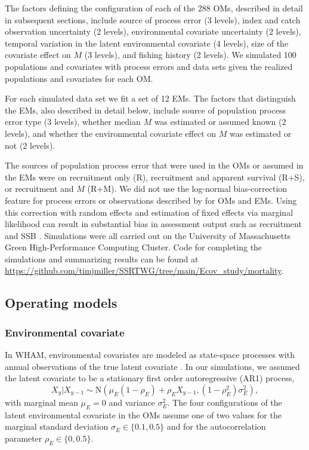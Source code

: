 \documentclass[
  12pt,
]{article}
\begin{document}
The factors defining the configuration of each of the 288 OMs, described
in detail in subsequent sections, include source of process error (3
levels), index and catch observation uncertainty (2 levels),
environmental covariate uncertainty (2 levels), temporal variation in
the latent environmental covariate (4 levels), size of the covariate
effect on \(M\) (3 levels), and fishing history (2 levels). We simulated
100 populations and covariates with process errors and data sets given
the realized populations and covariates for each OM.

For each simulated data set we fit a set of 12 EMs. The factors that
distinguish the EMs, also described in detail below, include source of
population process error type (3 levels), whether median \(M\) was
estimated or assumed known (2 levels), and whether the environmental
covariate effect on \(M\) was estimated or not (2 levels).

The sources of population process error that were used in the OMs or
assumed in the EMs were on recruitment only (R), recruitment and
apparent survival (R+S), or recruitment and \(M\) (R+M). We did not use
the log-normal bias-correction feature for process errors or
observations described by \citet{stockmiller21} for OMs and EMs. Using
this correction with random effects and estimation of fixed effects via
marginal likelihood can result in substantial bias in assessment output
such as recruitment and SSB \citep{lietal26}. Simulations were all
carried out on the University of Massachusetts Green High-Performance
Computing Cluster. Code for completing the simulations and summarizing
results can be found at
\url{https://github.com/timjmiller/SSRTWG/tree/main/Ecov_study/mortality}.

\subsection*{Operating models}\label{operating-models}

\subsubsection*{Environmental covariate}\label{environmental-covariate}

In WHAM, environmental covariates are modeled as state-space processes
with annual observations of the true latent covariate
\citep{milleretal16, stockmiller21}. In our simulations, we assumed the
latent covariate to be a stationary first order autoregressive (AR1)
process, \[
X_y|X_{y-1} \sim \text{N}\left(\mu_E\left(1-\rho_E\right) + \rho_E X_{y-1}, \left(1-\rho_E^2\right)\sigma^2_E\right),
\] with marginal mean \(\mu_E=0\) and variance \(\sigma^2_E\). The four
configurations of the latent environmental covariate in the OMs assume
one of two values for the marginal standard deviation
\(\sigma_E \in \{0.1, 0.5\}\) and for the autocorrelation parameter
\(\rho_E \in \{0, 0.5\}\).
\end{document}
